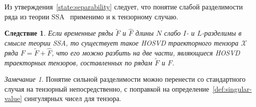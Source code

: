 \documentclass[specialist,
    substylefile = spbu_report.rtx,
    subf,href,colorlinks=true, 12pt]{disser}
\theoremstyle{plain}
\newtheorem{corollary}{Следствие}[statement]
\theoremstyle{definition}
\theoremstyle{remark}
\newtheorem*{remark}{Замечание}
\begin{document}
    Из утверждения~\ref{state:separability} следует, что понятие слабой разделимости ряда из теории SSA~\cite{ssa}
    применимо и к тензорному случаю.
    \begin{corollary}
        Если временные ряды $\tilde{F}$ и $\hat{F}$ длины $N$ слабо $I$- и $L$-разделимы в смысле теории \emph{SSA},
        то существует такое \emph{HOSVD} траекторного тензора $\mathcal{X}$ ряда $F=\tilde{F} + \hat{F}$, что его можно разбить
        на две части, являющиеся \emph{HOSVD} траекторных тензоров, составленных по рядам $\tilde{F}$ и $\hat{F}$.
    \end{corollary}
    \begin{remark}
        Понятие сильной разделимости можно перенести со стандартного случая на тензорный непосредственно, с поправкой на
        определение~\ref{def:singular-value} сингулярных чисел для тензора.
    \end{remark}
\end{document}
